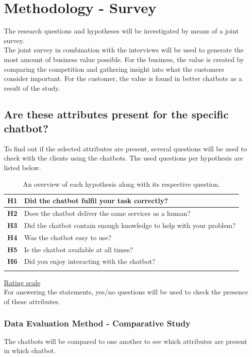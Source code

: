 \section{Methodology - Survey}
The research questions and hypotheses will be investigated by means of a joint survey.\\
\break
The joint survey in combination with the interviews will be used to generate the most amount of business value possible. For the business, the value is created by comparing the competition and gathering insight into what the customers consider important. For the customer, the value is found in better chatbots as a result of the study.\\

\subsection{Are these attributes present for the specific chatbot?}
To find out if the selected attributes are present, several questions will be used to check with the clients using the chatbots. The used questions per hypothesis are listed below.

\begin{longtable}{|l|l|}
	\hline
	\textbf{H1} & Did the chatbot fulfil your task correctly?                         \\ \hline
	\endfirsthead
	\endhead
	\textbf{H2} & Does the chatbot deliver the same services as a human?              \\ \hline
	\textbf{H3} & Did the chatbot contain enough knowledge to help with your problem? \\ \hline
	\textbf{H4} & Was the chatbot easy to use?                                        \\ \hline
	\textbf{H5} & Is the chatbot available at all times?                              \\ \hline
	\textbf{H6} & Did you enjoy interacting with the chatbot?                         \\ \hline
	\caption{An overview of each hypothesis along with its respective question.}
	\label{tab:YNOverview}
\end{longtable}
\ul{Rating scale}\\
For answering the statements, yes/no questions will be used to check the presence of these attributes.

\subsubsection{Data Evaluation Method - Comparative Study}
The chatbots will be compared to one another to see which attributes are present in which chatbot.

